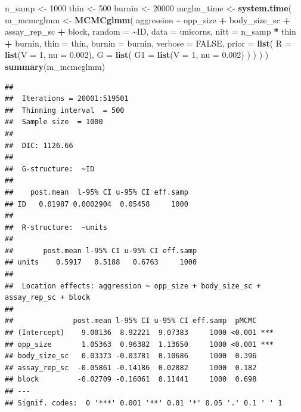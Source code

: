 \documentclass[
  12pt,
]{book}
\newenvironment{Shaded}{\begin{snugshade}}{\end{snugshade}}
\newcommand{\DataTypeTok}[1]{\textcolor[rgb]{0.13,0.29,0.53}{#1}}
\newcommand{\DecValTok}[1]{\textcolor[rgb]{0.00,0.00,0.81}{#1}}
\newcommand{\FloatTok}[1]{\textcolor[rgb]{0.00,0.00,0.81}{#1}}
\newcommand{\KeywordTok}[1]{\textcolor[rgb]{0.13,0.29,0.53}{\textbf{#1}}}
\newcommand{\NormalTok}[1]{#1}
\newcommand{\OperatorTok}[1]{\textcolor[rgb]{0.81,0.36,0.00}{\textbf{#1}}}
\newcommand{\OtherTok}[1]{\textcolor[rgb]{0.56,0.35,0.01}{#1}}
\newcommand{\StringTok}[1]{\textcolor[rgb]{0.31,0.60,0.02}{#1}}
\begin{document}
\begin{Shaded}
\begin{Highlighting}[]
\NormalTok{n\_samp \textless{}{-}}\StringTok{ }\DecValTok{1000}
\NormalTok{thin \textless{}{-}}\StringTok{ }\DecValTok{500}
\NormalTok{burnin \textless{}{-}}\StringTok{ }\DecValTok{20000}
\NormalTok{mcglm\_time \textless{}{-}}\StringTok{ }\KeywordTok{system.time}\NormalTok{(}
\NormalTok{  m\_mcmcglmm \textless{}{-}}\StringTok{ }\KeywordTok{MCMCglmm}\NormalTok{(}
\NormalTok{    aggression }\OperatorTok{\textasciitilde{}}\StringTok{ }\NormalTok{opp\_size }\OperatorTok{+}\StringTok{ }\NormalTok{body\_size\_sc }\OperatorTok{+}\StringTok{ }\NormalTok{assay\_rep\_sc }\OperatorTok{+}\StringTok{ }\NormalTok{block,}
    \DataTypeTok{random =} \OperatorTok{\textasciitilde{}}\NormalTok{ID,}
    \DataTypeTok{data =}\NormalTok{ unicorns,}
    \DataTypeTok{nitt =}\NormalTok{ n\_samp }\OperatorTok{*}\StringTok{ }\NormalTok{thin }\OperatorTok{+}\StringTok{ }\NormalTok{burnin, }\DataTypeTok{thin =}\NormalTok{ thin, }\DataTypeTok{burnin =}\NormalTok{ burnin,}
    \DataTypeTok{verbose =} \OtherTok{FALSE}\NormalTok{,}
    \DataTypeTok{prior =} \KeywordTok{list}\NormalTok{(}
      \DataTypeTok{R =} \KeywordTok{list}\NormalTok{(}\DataTypeTok{V =} \DecValTok{1}\NormalTok{, }\DataTypeTok{nu =} \FloatTok{0.002}\NormalTok{),}
      \DataTypeTok{G =} \KeywordTok{list}\NormalTok{(}
        \DataTypeTok{G1 =} \KeywordTok{list}\NormalTok{(}\DataTypeTok{V =} \DecValTok{1}\NormalTok{, }\DataTypeTok{nu =} \FloatTok{0.002}\NormalTok{)}
\NormalTok{      )}
\NormalTok{    )}
\NormalTok{  )}
\NormalTok{)}
\KeywordTok{summary}\NormalTok{(m\_mcmcglmm)}
\end{Highlighting}
\end{Shaded}

\begin{verbatim}
## 
##  Iterations = 20001:519501
##  Thinning interval  = 500
##  Sample size  = 1000 
## 
##  DIC: 1126.66 
## 
##  G-structure:  ~ID
## 
##    post.mean  l-95% CI u-95% CI eff.samp
## ID   0.01987 0.0002904  0.05458     1000
## 
##  R-structure:  ~units
## 
##       post.mean l-95% CI u-95% CI eff.samp
## units    0.5917   0.5188   0.6763     1000
## 
##  Location effects: aggression ~ opp_size + body_size_sc + assay_rep_sc + block 
## 
##              post.mean l-95% CI u-95% CI eff.samp  pMCMC    
## (Intercept)    9.00136  8.92221  9.07383     1000 <0.001 ***
## opp_size       1.05363  0.96382  1.13650     1000 <0.001 ***
## body_size_sc   0.03373 -0.03781  0.10686     1000  0.396    
## assay_rep_sc  -0.05861 -0.14186  0.02882     1000  0.182    
## block         -0.02709 -0.16061  0.11441     1000  0.698    
## ---
## Signif. codes:  0 '***' 0.001 '**' 0.01 '*' 0.05 '.' 0.1 ' ' 1
\end{verbatim}
\end{document}
